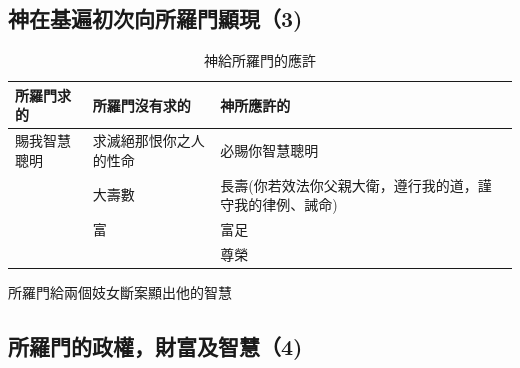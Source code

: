 \documentclass{ctexart}
\begin{document}
\subsection{神在基遍初次向所羅門顯現（3)}
\begin{table}[!hbp]
\centering
\begin{tabular}{|p{3cm}|p{5cm}|p{5cm}|}
\hline
\hline
所羅門求的    &所羅門沒有求的         &神所應許的 \\\hline\hline
賜我智慧聰明  & 求滅絕那恨你之人的性命&必賜你智慧聰明 \\\hline
              & 大壽數                &長壽(你若效法你父親大衛，遵行我的道，謹守我的律例、誡命) \\\hline
              &  富                       &富足\\\hline
              &&尊榮\\\hline
\end{tabular}
\caption{神給所羅門的應許}
\end{table}
所羅門給兩個妓女斷案顯出他的智慧

\subsection{所羅門的政權，財富及智慧（4)}
\end{document}
